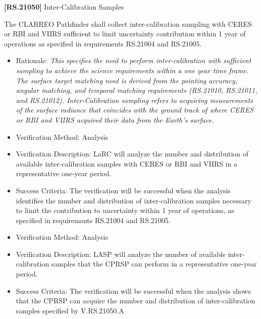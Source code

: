 \textbf{[RS.21050]} Inter-Calibration Samples

The \gls{CLARREO} Pathfinder shall \gls{collect} inter-calibration sampling with \gls{CERES} or \gls{RBI} and \gls{VIIRS} sufficient to limit uncertainty contribution within 1 year of operations as specified in requirements \gls{RS}.21004 and \gls{RS}.21005.

\begin{itemize}
\item{} Rationale: \emph{This specifies the need to perform inter-calibration with sufficient sampling to achieve the science requirements within a one year time frame. The surface target matching need is derived from the pointing accuracy, angular matching, and temporal matching requirements (RS.21010, RS.21011, and RS.21012). Inter-Calibration sampling refers to acquiring measurements of the surface radiance that coincides with the ground track of where CERES or RBI and VIIRS acquired their data from the Earth's surface.}

\item{} Verification Method: Analysis

\item{} Verification Description: \gls{LaRC} will analyze the number and distribution of available inter-calibration \gls{sample}s with \gls{CERES} or \gls{RBI} and \gls{VIIRS} in a representative one-year period.

\item{} Success Criteria: The verification will be successful when the \gls{analysis} identifies the number and distribution of inter-calibration \gls{sample}s necessary to limit the contribution to uncertainty within 1 year of operations, as specified in requirements \gls{RS}.21004 and \gls{RS}.21005.

\item{} Verification Method: Analysis

\item{} Verification Description: \gls{LASP} will analyze the number of available inter-calibration \gls{sample}s that the \gls{CPRSP} can perform in a representative one-year period.

\item{} Success Criteria: The verification will be successful when the \gls{analysis} shows that the \gls{CPRSP} can acquire the number and distribution of inter-calibration \gls{sample}s specified by V.\gls{RS}.21050.A

\end{itemize}

